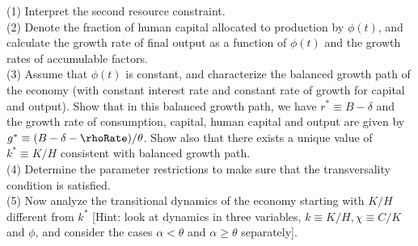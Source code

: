 \documentclass[\topdir/lecture\_notes.tex]{subfiles}
\begin{document}
(1) Interpret the second resource constraint.\\
(2) Denote the fraction of human capital allocated to production by $\phi(t)$, and calculate the growth rate of final output as a function of $\phi(t)$ and the growth rates of accumulable factors.\\
(3) Assume that $\phi(t)$ is constant, and characterize the balanced growth path of the economy (with constant interest rate and constant rate of growth for capital and output). Show that in this balanced growth path, we have $r^{*} \equiv B-\delta$ and the growth rate of consumption, capital, human capital and output are given by $g^{*} \equiv (B-\delta-\rhoRate) / \theta$. Show also that there exists a unique value of $k^{*} \equiv K / H$ consistent with balanced growth path.\\
(4) Determine the parameter restrictions to make sure that the transversality condition is satisfied.\\
(5) Now analyze the transitional dynamics of the economy starting with $K / H$ different from $k^*$ [Hint: look at dynamics in three variables, $k \equiv K / H, \chi \equiv C / K$ and $\phi$, and consider the cases $\alpha<\theta$ and $\alpha \geq \theta$ separately].
\end{document}
